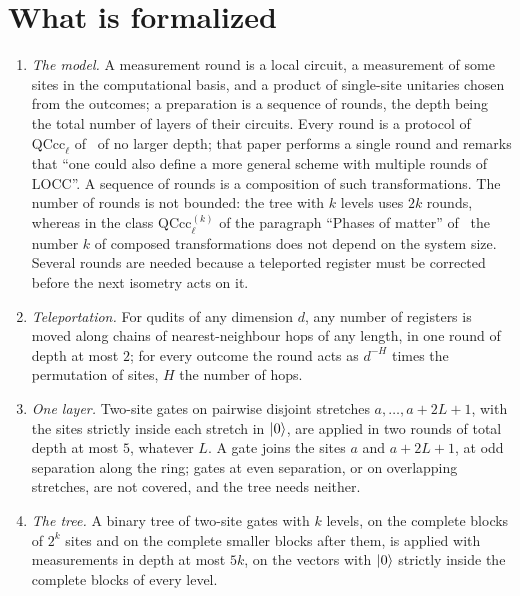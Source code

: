\documentclass{article}
\begin{document}
\section{What is formalized}
\begin{enumerate}
    \item \emph{The model.} A measurement round is a local circuit, a
          measurement of some sites in the computational basis, and a product of
          single-site unitaries chosen from the outcomes; a preparation is a
          sequence of rounds, the depth being the total number of layers of
          their circuits. Every round is a protocol of
          $\mathrm{QCcc}_\ell$ of~\cite{Piroli2021LOCC} of no larger depth;
          that paper performs a single round and remarks that ``one could also
          define a more general scheme with multiple rounds of LOCC''. A
          sequence of rounds is a composition of such transformations. The
          number of rounds is not bounded: the tree with $k$ levels uses $2k$
          rounds, whereas in the class $\mathrm{QCcc}^{(k)}_\ell$ of the
          paragraph ``Phases of matter'' of~\cite{Piroli2021LOCC} the number
          $k$ of composed transformations does not depend on the system
          size. Several rounds are needed because a
          teleported register must be corrected before the next isometry acts on
          it.
    \item \emph{Teleportation.} For qudits of any dimension $d$, any number of
          registers is moved along chains of nearest-neighbour hops of any
          length, in one round of depth at most $2$; for every outcome the round acts
          as $d^{-H}$ times the permutation of sites, $H$ the number of hops.
    \item \emph{One layer.} Two-site gates on pairwise disjoint stretches
          $a,\dots,a+2L+1$, with the sites strictly inside each stretch in
          $|0\rangle$, are applied in two rounds of total depth at most $5$,
          whatever $L$.
          A gate joins the sites $a$ and $a+2L+1$, at odd separation along the
          ring; gates at even separation, or on overlapping stretches, are not
          covered, and the tree needs neither.
    \item \emph{The tree.} A binary tree of two-site gates with $k$ levels, on the
          complete blocks of $2^k$ sites and on the complete smaller blocks
          after them, is applied with measurements in depth at most $5k$, on the
          vectors
          with $|0\rangle$ strictly inside the complete blocks of every level.

\end{enumerate}
\end{document}
